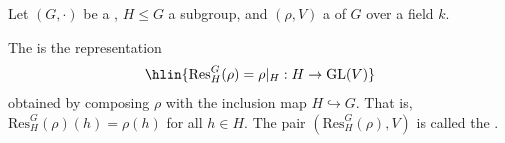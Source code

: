 \begin{definition} \label{definition:restriction_of_a_representation_of_a_group_to_a_subgroup}

    Let $(G, \cdot)$ be a , $H \leq G$ a subgroup, and $(\rho, V)$ a  of $G$ over a field $k$.

    The  is the representation
    $$\hlin{\mathrm{Res}_H^G(\rho) = \rho|_H : H \to \mathrm{GL}(V)}$$
    obtained by composing $\rho$ with the inclusion map $H \hookrightarrow G$. That is, $\mathrm{Res}_H^G(\rho)(h) = \rho(h)$ for all $h \in H$. The pair $(\mathrm{Res}_H^G(\rho), V)$ is called the .
\end{definition}
